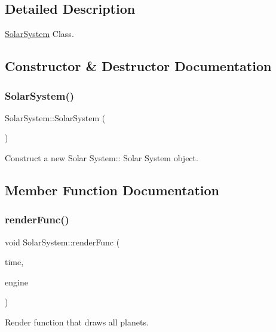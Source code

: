 \subsection{Detailed Description}
\mbox{\hyperlink{classSolarSystem}{Solar\+System}} Class. 



\subsection{Constructor \& Destructor Documentation}
\mbox{\label{classSolarSystem_aba929f8f95361b60df93e505278ca725}} 
\subsubsection{\texorpdfstring{SolarSystem()}{SolarSystem()}}
{\footnotesize\ttfamily Solar\+System\+::\+Solar\+System (\begin{DoxyParamCaption}{ }\end{DoxyParamCaption})}



Construct a new Solar System\+:\+: Solar System object. 



\subsection{Member Function Documentation}
\mbox{\label{classSolarSystem_a91ab39c491fb5f4f8f95dcebce03a0d4}} 
\subsubsection{\texorpdfstring{renderFunc()}{renderFunc()}}
{\footnotesize\ttfamily void Solar\+System\+::render\+Func (\begin{DoxyParamCaption}\item[{G\+Luint}]{time,  }\item[{\mbox{\hyperlink{classEngine}{Engine}}}]{engine }\end{DoxyParamCaption})}



Render function that draws all planets. 


